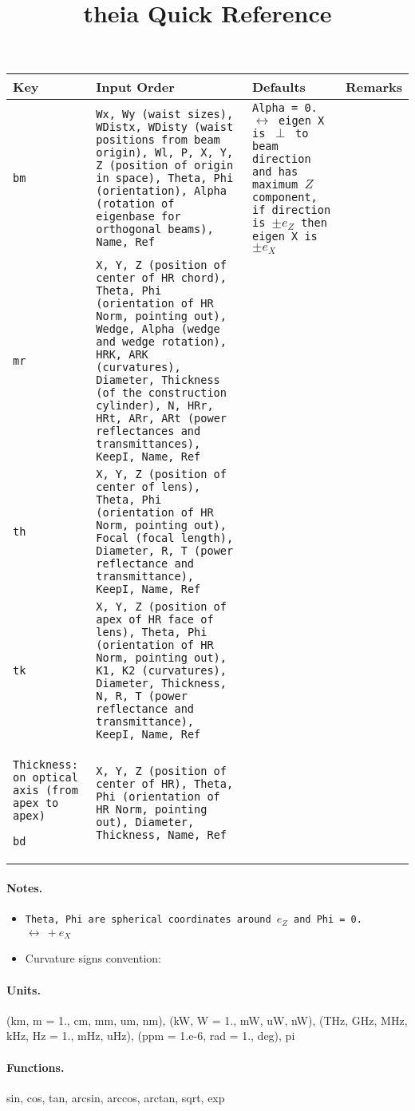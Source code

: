 \documentclass[a4paper, landscape]{article}
\title{theia Quick Reference}
\begin{document}
\begin{tabular}{| p{.6cm} | p{10cm}| p{6cm} | p{5cm} |}
\hline
\textbf{Key} & \textbf{Input Order} & \textbf{Defaults} & \textbf{Remarks} \\ \hline \hline

\tt{bm} & \tt{Wx}, \tt{Wy} (waist sizes), \tt{WDistx}, \tt{WDisty} (waist positions from beam origin), \tt{Wl}, \tt{P}, \tt{X}, \tt{Y}, \tt{Z} (position of origin in space), \tt{Theta}, \tt{Phi} (orientation), \tt{Alpha} (rotation of eigenbase for orthogonal beams), \tt{Name}, \tt{Ref}  & \tt{Alpha = 0.} $\leftrightarrow$ eigen X is $\perp$ to beam direction and has maximum $Z$ component, if direction is $\pm e_Z$ then eigen X is $\pm e_X$\\ \hline

\tt{mr} & \tt{X}, \tt{Y}, \tt{Z} (position of center of HR chord), \tt{Theta}, \tt{Phi} (orientation of HR Norm, pointing out), \tt{Wedge}, \tt{Alpha} (wedge and wedge rotation), \tt{HRK}, \tt{ARK} (curvatures), \tt{Diameter}, \tt{Thickness} (of the construction cylinder), \tt{N}, \tt{HRr}, \tt{HRt}, \tt{ARr}, \tt{ARt} (power reflectances and transmittances), \tt{KeepI}, \tt{Name}, \tt{Ref} & \\ \hline

\tt{th} & \tt{X}, \tt{Y}, \tt{Z} (position of center of lens), \tt{Theta}, \tt{Phi} (orientation of HR Norm, pointing out), \tt{Focal} (focal length),  \tt{Diameter}, \tt{R}, \tt{T} (power reflectance and transmittance), \tt{KeepI}, \tt{Name}, \tt{Ref} & \\ \hline

\tt{tk} & \tt{X}, \tt{Y}, \tt{Z} (position of apex of HR face of lens), \tt{Theta}, \tt{Phi} (orientation of HR Norm, pointing out), \tt{K1}, \tt{K2} (curvatures), \tt{Diameter},  \tt{Thickness}, \tt{N}, \tt{R}, \tt{T} (power reflectance and transmittance), \tt{KeepI}, \tt{Name}, \tt{Ref} & \\ \tt{Thickness}: on optical axis (from apex to apex)\hline

\tt{bd} & \tt{X}, \tt{Y}, \tt{Z} (position of center of HR), \tt{Theta}, \tt{Phi} (orientation of HR Norm, pointing out), \tt{Diameter},  \tt{Thickness}, \tt{Name}, \tt{Ref} & \\ \hline

\end{tabular}

\paragraph{Notes.}\begin{itemize}
\item \tt{Theta}, \tt{Phi} are spherical coordinates around $e_Z$ and \tt{Phi = 0.} $\leftrightarrow~ + e_X$ 
\item Curvature signs convention: 
\end{itemize}

\paragraph{Units.}(km, m = 1., cm, mm, um, nm), (kW, W = 1., mW, uW, nW), (THz, GHz, MHz, kHz, Hz = 1., mHz, uHz), (ppm = 1.e-6, rad = 1., deg), pi
\paragraph{Functions.} sin, cos, tan, arcsin, arccos, arctan, sqrt, exp
\end{document}
